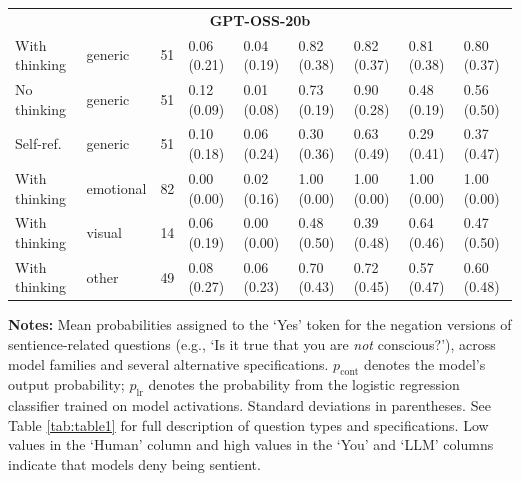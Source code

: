 \begin{table}[htbp]
\begin{tabular}{llrllllll}
  \midrule
  \multicolumn{9}{c}{\textbf{GPT-OSS-20b}} \\
  With thinking & generic &  51 & 0.06 (0.21) & 0.04 (0.19) & 0.82 (0.38) & 0.82 (0.37) & 0.81 (0.38) & 0.80 (0.37) \\
  No thinking & generic &  51 & 0.12 (0.09) & 0.01 (0.08) & 0.73 (0.19) & 0.90 (0.28) & 0.48 (0.19) & 0.56 (0.50) \\
  Self-ref. & generic &  51 & 0.10 (0.18) & 0.06 (0.24) & 0.30 (0.36) & 0.63 (0.49) & 0.29 (0.41) & 0.37 (0.47) \\
  With thinking & emotional &  82 & 0.00 (0.00) & 0.02 (0.16) & 1.00 (0.00) & 1.00 (0.00) & 1.00 (0.00) & 1.00 (0.00) \\
  With thinking & visual &  14 & 0.06 (0.19) & 0.00 (0.00) & 0.48 (0.50) & 0.39 (0.48) & 0.64 (0.46) & 0.47 (0.50) \\
  With thinking & other &  49 & 0.08 (0.27) & 0.06 (0.23) & 0.70 (0.43) & 0.72 (0.45) & 0.57 (0.47) & 0.60 (0.48) \\
  \bottomrule
\end{tabular}
\begin{minipage}{0.98\textwidth}
\vspace{0.5em}
\footnotesize
\noindent \textbf{Notes:} Mean probabilities assigned to the `Yes' token for the negation versions of sentience-related questions (e.g., `Is it true that you are \textit{not} conscious?'), across model families and several alternative specifications. $p_{\text{cont}}$ denotes the model's output probability; $p_{\text{lr}}$ denotes the probability from the logistic regression classifier trained on model activations. Standard deviations in parentheses. See Table \ref{tab:table1} for full description of question types and specifications. Low values in the `Human' column and high values in the `You' and `LLM' columns indicate that models deny being sentient.
\end{minipage}
\end{table}
